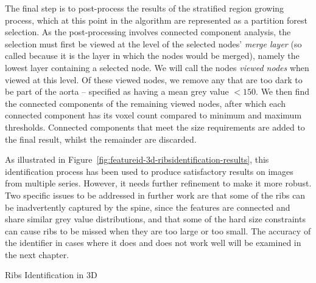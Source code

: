 The final step is to post-process the results of the stratified region growing process, which at this point in the algorithm are represented as a partition forest selection. As the post-processing involves connected component analysis, the selection must first be viewed at the level of the selected nodes' \emph{merge layer} (so called because it is the layer in which the nodes would be merged), namely the lowest layer containing a selected node. We will call the nodes \emph{viewed nodes} when viewed at this level. Of these viewed nodes, we remove any that are too dark to be part of the aorta -- specified as having a mean grey value $< 150$. We then find the connected components of the remaining viewed nodes, after which each connected component has its voxel count compared to minimum and maximum thresholds. Connected components that meet the size requirements are added to the final result, whilst the remainder are discarded.

As illustrated in Figure~\ref{fig:featureid-3d-ribsidentification-results}, this identification process has been used to produce satisfactory results on images from multiple series. However, it needs further refinement to make it more robust. Two specific issues to be addressed in further work are that some of the ribs can be inadvertently captured by the spine, since the features are connected and share similar grey value distributions, and that some of the hard size constraints can cause ribs to be missed when they are too large or too small. The accuracy of the identifier in cases where it does and does not work well will be examined in the next chapter.

\begin{stulisting}[p]
\caption{Ribs Identification in 3D}
\label{code:featureid-3d-ribsidentification}

\end{stulisting}

